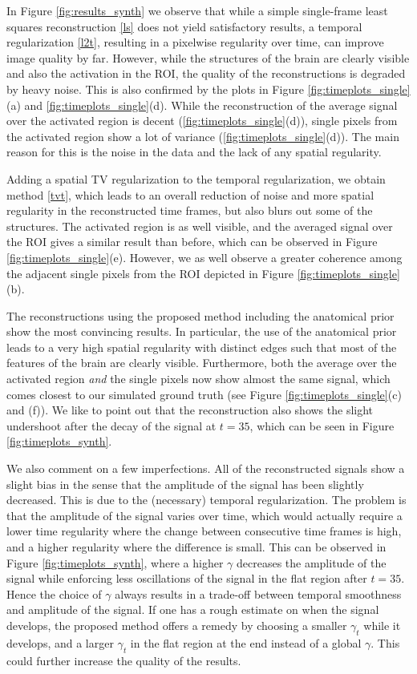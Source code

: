 In Figure \ref{fig:results_synth} we observe that while a simple single-frame least squares reconstruction \eqref{ls} does not yield satisfactory results, a temporal regularization \eqref{l2t}, resulting in a pixelwise regularity over time, can improve image quality by far. 
However, while the structures of the brain are clearly visible and also the activation in the ROI, the quality of the reconstructions is degraded by heavy noise. 
This is also confirmed by the plots in Figure \ref{fig:timeplots_single}(a) and \ref{fig:timeplots_single}(d). 
While the reconstruction of the average signal over the activated region is decent (\ref{fig:timeplots_single}(d)), single pixels from the activated region show a lot of variance (\ref{fig:timeplots_single}(d)). 
The main reason for this is the noise in the data and the lack of any spatial regularity.

Adding a spatial TV regularization to the temporal regularization, we obtain method \eqref{tvt}, which leads to an overall reduction of noise and more spatial regularity in the reconstructed time frames, but also blurs out some of the structures.  
The activated region is as well visible, and the averaged signal over the ROI gives a similar result than before, which can be observed in Figure \ref{fig:timeplots_single}(e). 
However, we as well observe a greater coherence among the adjacent single pixels from the ROI depicted in Figure \ref{fig:timeplots_single}(b). 

The reconstructions using the proposed method including the anatomical prior show the most convincing results. 
In particular, the use of the anatomical prior leads to a very high spatial regularity with distinct edges such that most of the features of the brain are clearly visible. 
Furthermore, both the average over the activated region {\it and} the single pixels now show almost the same signal, which comes closest to our simulated ground truth (see Figure \ref{fig:timeplots_single}(c) and (f)). 
We like to point out that the reconstruction also shows the slight undershoot after the decay of the signal at $t=35$, which can be seen in Figure \ref{fig:timeplots_synth}.

We also comment on a few imperfections. 
All of the reconstructed signals show a slight bias in the sense that the amplitude of the signal has been slightly decreased. 
This is due to the (necessary) temporal regularization. 
The problem is that the amplitude of the signal varies over time, which would actually require a lower time regularity where the change between consecutive time frames is high, and a higher regularity where the difference is small. 
This can be observed in Figure \ref{fig:timeplots_synth}, where a higher $\gamma$ decreases the amplitude of the signal while enforcing less oscillations of the signal in the flat region after $t=35$.
Hence the choice of $\gamma$ always results in a trade-off between temporal smoothness and amplitude of the signal. 
If one has a rough estimate on when the signal develops, the proposed method offers a remedy by choosing a smaller $\gamma_t$ while it develops, and a larger $\gamma_t$ in the flat region at the end instead of a global $\gamma$.
This could further increase the quality of the results. 

